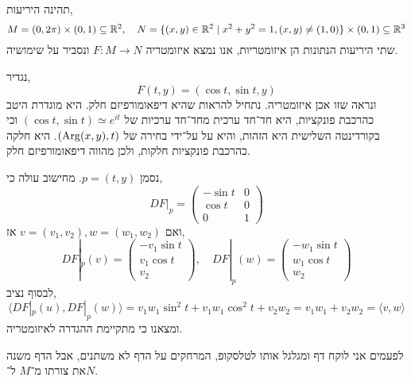\subquestion{}
תהינה היריעות,
\[
	M = (0, 2 \pi) \times (0, 1) \subseteq \mathbb{R}^2,
	\quad
	N = \{ (x, y) \in \mathbb{R}^2 \mid x^2 + y^2 = 1, (x, y) \ne (1, 0) \} \times (0, 1) \subseteq \mathbb{R}^3
\]
שתי היריעות הנתונות הן איזומטריות, אנו נמצא איזומטריה $F : M \to N$ ונסביר על שימושיה.
\begin{solution}
	נגדיר,
	\[
		F(t, y)
		= (\cos t, \sin t, y)
	\]
	ונראה שזו אכן איזומטריה.
	נתחיל להראות שהיא דיפאומורפיזם חלק.
	היא מוגדרת היטב כהרכבת פונקציות, היא חד־חד ערכית מחד־חד ערכיות של $(\cos t, \sin t) \simeq e^{it}$ וכי בקורדינטה השלישית היא הזהות, והיא על על־ידי בחירה של $(\operatorname{Arg} (x, y), t)$.
	היא חלקה כהרכבת פונקציות חלקות, ולכן מהווה דיפאומורפיזם חלק.

	נסמן $p = (t, y)$.
	מחישוב עולה כי,
	\[
		D F |_p
		= \begin{pmatrix}
			- \sin t & 0 \\
			\cos t & 0 \\
			0 & 1
		\end{pmatrix} 
	\]
	ואם $v = (v_1, v_2), w = (w_1, w_2)$ אז,
	\[
		D F |_{p}(v)
		= \begin{pmatrix} - v_1 \sin t \\ v_1 \cos t \\ v_2 \end{pmatrix},
		\quad
		D F |_{p}(w)
		= \begin{pmatrix} - w_1 \sin t \\ w_1 \cos t \\ w_2 \end{pmatrix}
	\]
	לבסוף נציב,
	\[
		\langle D F |_p(u), D F |_p(w) \rangle
		= v_1 w_1 \sin^2 t + v_1 w_1 \cos^2 t + v_2 w_2
		= v_1 w_1 + v_2 w_2
		= \langle v, w \rangle
	\]
	ומצאנו כי מתקיימת ההגדרה לאיזומטריה.

	לפעמים אני לוקח דף ומגלגל אותו לטלסקופ, המרחקים על הדף לא משתנים, אבל הדף משנה את צורתו מ־$M$ ל־$N$.
\end{solution}

